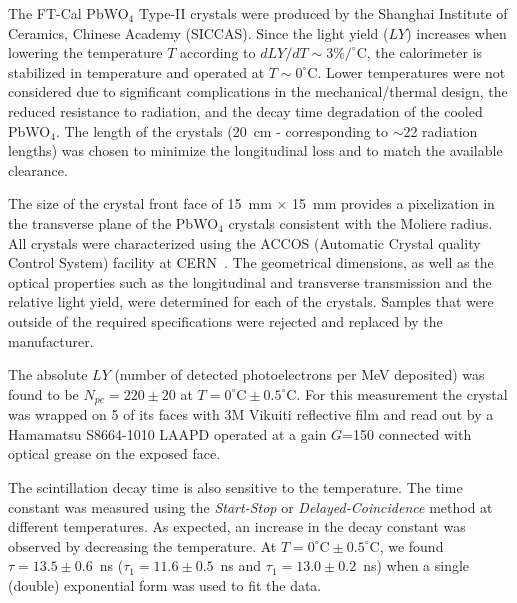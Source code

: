 The FT-Cal PbWO$_4$ Type-II crystals were produced by the Shanghai Institute of Ceramics, Chinese Academy
(SICCAS). Since the light yield ($LY$) increases when lowering the temperature $T$ according to 
$dLY/dT \sim 3\%/^\circ$C, the calorimeter is stabilized in temperature and operated at
$T \sim 0^\circ$C. Lower temperatures were not considered due to significant complications in the
mechanical/thermal design, the reduced resistance to radiation,  and the decay time degradation of the cooled
PbWO$_4$. The length of the crystals (20~cm - corresponding to $\sim$22 radiation lengths) was chosen to
minimize the longitudinal loss and to match the available clearance.

The size of the crystal front face of 15~mm $\times$ 15~mm provides a pixelization in the transverse plane of
the PbWO$_4$ crystals consistent with the Moliere radius. All crystals were characterized using the ACCOS
(Automatic Crystal quality Control System) facility at CERN~\cite{accos}. The geometrical dimensions, as well as the
optical properties such as the longitudinal and transverse transmission and the relative light yield, were determined
for each of the crystals. Samples that were outside of the required specifications were rejected and replaced by the
manufacturer. 

The absolute $LY$ (number of detected photoelectrons per MeV deposited) was found to be $N_{pe}=220\pm 20$
at $T=0^\circ\textrm{C}\pm 0.5^\circ\textrm{C}$. For this measurement the crystal was wrapped on 5 of its faces
with 3M Vikuiti reflective film and read out by a Hamamatsu S8664-1010 LAAPD operated at a gain $G$=150
connected with optical grease on the exposed face. 

The scintillation decay time is also sensitive to the temperature. The time constant was measured using the
{\it Start-Stop} or {\it Delayed-Coincidence} method at different temperatures. As expected, an increase in the
decay constant was observed by decreasing the temperature. At $T=0^\circ\textrm{C}\pm 0.5^\circ\textrm{C}$, we
found $\tau=13.5\pm 0.6$~ns ($\tau_1=11.6\pm 0.5$~ns and $\tau_1=13.0\pm 0.2$~ns) when a single (double)
exponential form was used to fit the data.

